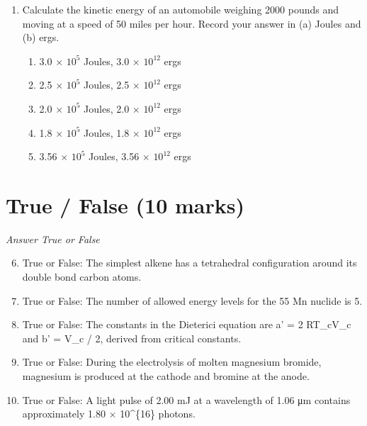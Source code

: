 \documentclass[12pt]{article}
\begin{document}
\begin{enumerate}[label=\arabic*.]
\begin{enumerate}[label=(\alph*)]
    \item 1.75
    \item 3.50
    \item 14.00
    \item 10.00
    \item 12.00
\end{enumerate}
\item Calculate the kinetic energy of an automobile weighing 2000 pounds and moving at a speed of 50 miles per hour. Record your answer in (a) Joules and (b) ergs.
\begin{enumerate}[label=(\alph*)]
    \item 3.0 \ensuremath{\times} $10^5$ Joules, 3.0 \ensuremath{\times} $10^12$ ergs
    \item 2.5 \ensuremath{\times} $10^5$ Joules, 2.5 \ensuremath{\times} $10^12$ ergs
    \item 2.0 \ensuremath{\times} $10^5$ Joules, 2.0 \ensuremath{\times} $10^12$ ergs
    \item 1.8 \ensuremath{\times} $10^5$ Joules, 1.8 \ensuremath{\times} $10^12$ ergs
    \item 3.56 \ensuremath{\times} $10^5$ Joules, 3.56 \ensuremath{\times} $10^12$ ergs
\end{enumerate}
\end{enumerate}

\section*{True / False (10 marks)}
\textit{Answer True or False}
\begin{enumerate}[label=\arabic*.]
\setcounter{enumi}{5}
\item True or False: The simplest alkene has a tetrahedral configuration around its double bond carbon atoms.
\item True or False: The number of allowed energy levels for the 55 Mn nuclide is 5.
\item True or False: The constants in the Dieterici equation are a' = 2 RT\_cV\_c and b' = V\_c / 2, derived from critical constants.
\item True or False: During the electrolysis of molten magnesium bromide, magnesium is produced at the cathode and bromine at the anode.
\item True or False: A light pulse of 2.00 mJ at a wavelength of 1.06 μm contains approximately 1.80 \ensuremath{\times} 10^\{16\} photons.
\end{enumerate}
\end{document}
